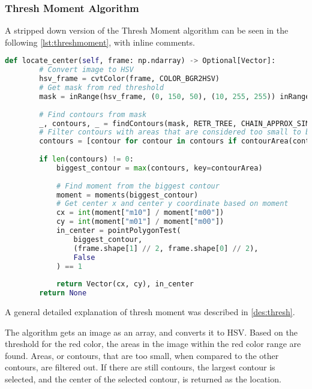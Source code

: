 \subsubsection{Thresh Moment Algorithm}\label{solution:thresh_moment}
A stripped down version of the Thresh Moment algorithm can be seen in the following \autoref{lst:threshmoment}, with inline comments.

\begin{lstlisting}[language=Python,label={lst:threshmoment},caption={Stripped down version of thresh moment from thresh\_moment.py}]
	def locate_center(self, frame: np.ndarray) -> Optional[Vector]:
	    # Convert image to HSV
	    hsv_frame = cvtColor(frame, COLOR_BGR2HSV)
	    # Get mask from red threshold
	    mask = inRange(hsv_frame, (0, 150, 50), (10, 255, 255)) inRange(hsv_frame, (170, 150, 50), (180, 255, 255))
	    
	    # Find contours from mask
	    _, contours, _ = findContours(mask, RETR_TREE, CHAIN_APPROX_SIMPLE)
	    # Filter contours with areas that are considered too small to be the target
	    contours = [contour for contour in contours if contourArea(contour) > 20]
	    
	    if len(contours) != 0:
		    biggest_contour = max(contours, key=contourArea)
		    
		    # Find moment from the biggest contour
		    moment = moments(biggest_contour)
		    # Get center x and center y coordinate based on moment
		    cx = int(moment["m10"] / moment["m00"])
		    cy = int(moment["m01"] / moment["m00"])
            in_center = pointPolygonTest(
			    biggest_contour,
			    (frame.shape[1] // 2, frame.shape[0] // 2),
		    	False
		    ) == 1
		    
		    return Vector(cx, cy), in_center
	    return None
\end{lstlisting}

A general detailed explanation of thresh moment was described in \autoref{des:thresh}.

The algorithm gets an image as an array, and converts it to HSV.
Based on the threshold for the red color, the areas in the image within the red color range are found. 
Areas, or contours, that are too small, when compared to the other contours, are filtered out.
If there are still contours, the largest contour is selected, and the center of the selected contour, is returned as the location.